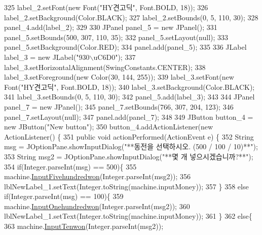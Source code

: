 \begin{DoxyCode}
325         label\_2.setFont(\textcolor{keyword}{new} Font(\textcolor{stringliteral}{"HY견고딕"}, Font.BOLD, 18));
326         label\_2.setBackground(Color.BLACK);
327         label\_2.setBounds(0, 5, 110, 30);
328         panel\_4.add(label\_2);
329         
330         JPanel panel\_5 = \textcolor{keyword}{new} JPanel();
331         panel\_5.setBounds(500, 307, 110, 35);
332         panel\_5.setLayout(null);
333         panel\_5.setBackground(Color.RED);
334         panel.add(panel\_5);
335         
336         JLabel label\_3 = \textcolor{keyword}{new} JLabel(\textcolor{stringliteral}{"930\(\backslash\)uC6D0"});
337         label\_3.setHorizontalAlignment(SwingConstants.CENTER);
338         label\_3.setForeground(\textcolor{keyword}{new} Color(30, 144, 255));
339         label\_3.setFont(\textcolor{keyword}{new} Font(\textcolor{stringliteral}{"HY견고딕"}, Font.BOLD, 18));
340         label\_3.setBackground(Color.BLACK);
341         label\_3.setBounds(0, 5, 110, 30);
342         panel\_5.add(label\_3);
343         
344         JPanel panel\_7 = \textcolor{keyword}{new} JPanel();
345         panel\_7.setBounds(766, 307, 204, 123);
346         panel\_7.setLayout(null);
347         panel.add(panel\_7);
348         
349         JButton button\_4 = \textcolor{keyword}{new} JButton(\textcolor{stringliteral}{"New button"});
350         button\_4.addActionListener(\textcolor{keyword}{new} ActionListener() \{
351             \textcolor{keyword}{public} \textcolor{keywordtype}{void} actionPerformed(ActionEvent e) \{
352                 String msg = JOptionPane.showInputDialog(\textcolor{stringliteral}{"**동전을 선택하시오. (500 / 100 / 10)**"});
353                 String msg2 = JOptionPane.showInputDialog(\textcolor{stringliteral}{"**몇 개 넣으시겠습니까?**"});
354                 \textcolor{keywordflow}{if}(Integer.parseInt(msg) == 500)\{
355                     machine.\hyperlink{classsehw1_1_1machine_a7e5f2486a3264f3ed6dc823264e65a74}{InputFivehundredwon}(Integer.parseInt(msg2));
356                     lblNewLabel\_1.setText(Integer.toString(machine.inputMoney));
357                 \}
358                 \textcolor{keywordflow}{else} \textcolor{keywordflow}{if}(Integer.parseInt(msg) == 100)\{
359                     machine.\hyperlink{classsehw1_1_1machine_a4ef785bc6335a056e0e071ef342e80f0}{InputOnehundredwon}(Integer.parseInt(msg2));
360                     lblNewLabel\_1.setText(Integer.toString(machine.inputMoney));
361                 \}
362                 \textcolor{keywordflow}{else}\{
363                     machine.\hyperlink{classsehw1_1_1machine_a8fea30b54625f76b494bbc292397a305}{InputTenwon}(Integer.parseInt(msg2));

\end{DoxyCode}

